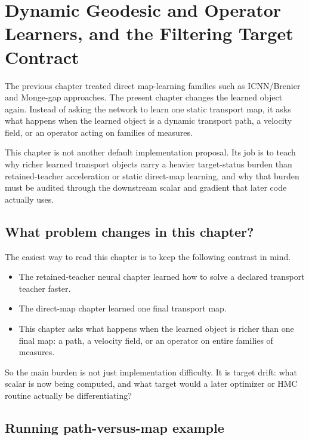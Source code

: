 \chapter{Dynamic Geodesic and Operator Learners, and the Filtering Target Contract}
\label{ch:bf-neural-ot-dynamic-target-contract}

The previous chapter treated direct map-learning families such as ICNN/Brenier
and Monge-gap approaches.  The present chapter changes the learned object again.
Instead of asking the network to learn one static transport map, it asks what
happens when the learned object is a dynamic transport path, a velocity field, or
an operator acting on families of measures.

This chapter is not another default implementation proposal.  Its job is to
teach why richer learned transport objects carry a heavier target-status burden
than retained-teacher acceleration or static direct-map learning, and why that
burden must be audited through the downstream scalar and gradient that later code
actually uses.

\section{What problem changes in this chapter?}
\label{sec:bf-neural-ot-dynamic-orientation}

The easiest way to read this chapter is to keep the following contrast in mind.
\begin{itemize}
  \item The retained-teacher neural chapter learned how to solve a declared
  transport teacher faster.
  \item The direct-map chapter learned one final transport map.
  \item This chapter asks what happens when the learned object is richer than one
  final map: a path, a velocity field, or an operator on entire families of
  measures.
\end{itemize}

So the main burden is not just implementation difficulty.  It is target drift:
what scalar is now being computed, and what target would a later optimizer or
HMC routine actually be differentiating?

\section{Running path-versus-map example}
\label{sec:bf-neural-ot-dynamic-toy-contrast}

